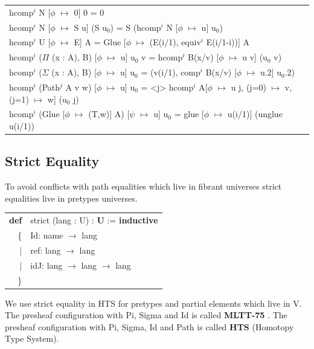 \documentclass[a4paper,UKenglish,cleveref, autoref, thm-restate]{lipics-v2021}
\newcommand{\tabstyle}[0]{\scriptsize\ttfamily\fontseries{l}\selectfont}
\begin{document}
\begin{table}[ht!]
\tabstyle
\begin{tabular}{l}
hcomp$^i$ N [$\phi$ $\mapsto$ 0] 0 = 0 \\
hcomp$^i$ N [$\phi$ $\mapsto$ S u] (S u$_0$) = S (hcomp$^i$ N [$\phi$ $\mapsto$ u] u$_0$) \\
hcomp$^i$ U [$\phi$ $\mapsto$ E] A = Glue [$\phi$ $\mapsto$ (E(i/1), equiv$^i$ E(i/1-i))] A \\
hcomp$^i$ ($\Pi$ (x : A), B) [$\phi$ $\mapsto$ u] u$_0$ v = hcomp$^i$ B(x/v) [$\phi$ $\mapsto$ u v] (u$_0$ v) \\
hcomp$^i$ ($\Sigma$ (x : A), B) [$\phi$ $\mapsto$ u] u$_0$ = (v(i/1), comp$^i$ B(x/v) [$\phi$ $\mapsto$ u.2] u$_0$.2) \\
hcomp$^i$ (Path$^j$ A v w) [$\phi$ $\mapsto$ u] u$_0$ = <j> hcomp$^i$ A[$\phi$ $\mapsto$ u j, (j=0) $\mapsto$ v, (j=1) $\mapsto$ w] (u$_0$ j) \\
hcomp$^i$ (Glue [$\phi$ $\mapsto$ (T,w)] A) [$\psi$ $\mapsto$ u] u$_0$ = glue [$\phi$ $\mapsto$ u(i/1)] (unglue u(i/1)) \\
\end{tabular}
\end{table}

\subsection{Strict Equality}

To avoid conflicts with path equalities which live in fibrant universes strict
equalities live in pretypes universes.

\begin{table}[ht!]
\tabstyle
\begin{tabular}{rl}
     \textbf{def} & strict (lang : U) : \textbf{U} := \textbf{inductive} \\\
 \{ & Id: name $\rightarrow$ lang \\
  |& ref: lang $\rightarrow$ lang \\
  |& idJ: lang $\rightarrow$ lang $\rightarrow$ lang \\
                         \} & \\
\end{tabular}
\end{table}

We use strict equality in HTS for pretypes and partial elements which live in V.
The presheaf configuration with Pi, Sigma and Id is called \textbf{MLTT-75} \cite{MLTT75}. The presheaf
configuration with Pi, Sigma, Id and Path is called \textbf{HTS} (Homotopy Type System).
\end{document}
